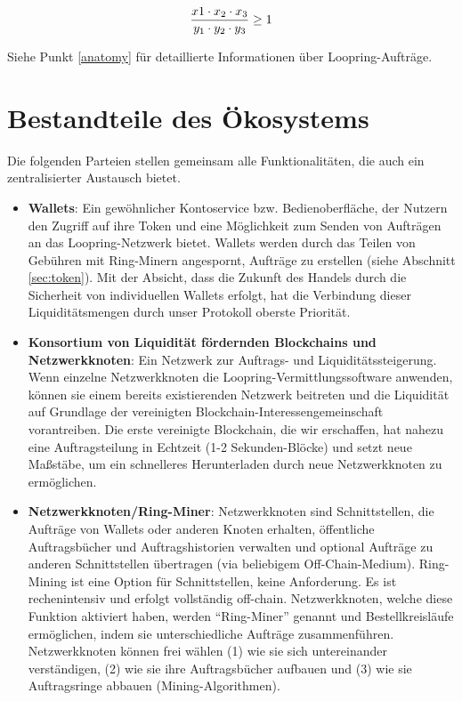 \documentclass[UTF8,nofonts]{article}
\begin{document}
\begin{multicols}{2}
\begin{equation}
{{x1 \cdot x_2 \cdot x_3 \over y_1 \cdot y_2 \cdot y_3} \geq 1}
\end{equation}


Siehe Punkt \ref{anatomy} für detaillierte Informationen über Loopring-Aufträge.



\section{Bestandteile des Ökosystems\label{sec:ecosystem}}
Die folgenden Parteien stellen gemeinsam alle Funktionalitäten, die auch ein zentralisierter Austausch bietet.

\begin{itemize}

\item \textbf{Wallets}: Ein gewöhnlicher Kontoservice bzw. Bedienoberfläche, der Nutzern den Zugriff auf ihre Token und eine Möglichkeit zum Senden von Aufträgen an das Loopring-Netzwerk bietet. Wallets werden durch das Teilen von Gebühren mit Ring-Minern angespornt, Aufträge zu erstellen (siehe Abschnitt \ref{sec:token}). Mit der Absicht, dass die Zukunft des Handels durch die Sicherheit von individuellen Wallets erfolgt, hat die Verbindung dieser Liquiditätsmengen durch unser Protokoll oberste Priorität.

\item \textbf{Konsortium von Liquidität fördernden Blockchains und Netzwerkknoten}: Ein Netzwerk zur Auftrags- und Liquiditätssteigerung. Wenn einzelne Netzwerkknoten die Loopring-Vermittlungssoftware anwenden, können sie einem bereits existierenden Netzwerk beitreten und die Liquidität auf Grundlage der vereinigten Blockchain-Interessengemeinschaft vorantreiben. Die erste vereinigte Blockchain, die wir erschaffen, hat nahezu eine Auftragsteilung in Echtzeit (1-2 Sekunden-Blöcke) und setzt neue Maßstäbe, um ein schnelleres Herunterladen durch neue Netzwerkknoten zu ermöglichen.

\item \textbf{Netzwerkknoten/Ring-Miner}: Netzwerkknoten sind Schnittstellen, die Aufträge von Wallets oder anderen Knoten erhalten, öffentliche Auftragsbücher und Auftragshistorien verwalten und optional Aufträge zu anderen Schnittstellen übertragen (via beliebigem Off-Chain-Medium). Ring-Mining ist eine Option für Schnittstellen, keine Anforderung. Es ist rechenintensiv und erfolgt vollständig off-chain. Netzwerkknoten, welche diese Funktion aktiviert haben, werden \enquote{Ring-Miner} genannt und Bestellkreisläufe ermöglichen, indem sie unterschiedliche Aufträge zusammenführen. Netzwerkknoten können frei wählen (1) wie sie sich untereinander verständigen, (2) wie sie ihre Auftragsbücher aufbauen und (3) wie sie Auftragsringe abbauen (Mining-Algorithmen).


\end{itemize}
\end{multicols}
\end{document}
